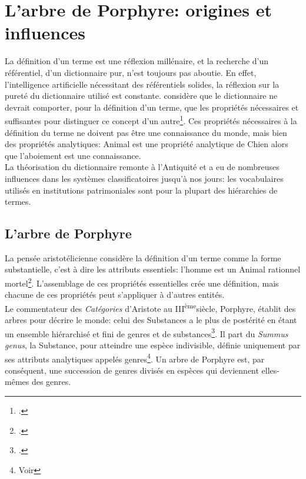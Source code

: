\section{\label{I-C-1}L'arbre de Porphyre: origines et influences}

La définition d'un terme est une réflexion millénaire, et la recherche d'un référentiel, d'un dictionnaire pur, n'est toujours pas aboutie. En effet, l'intelligence artificielle nécessitant des référentiels solides, la réflexion sur la pureté du dictionnaire utilisé est constante.  considère que le dictionnaire \og ne devrait comporter, pour la définition d'un  terme, que les propriétés nécessaires et suffisantes pour distinguer ce concept d'un autre\fg\footcite[chap.1]{eco_arbre_2010}. Ces propriétés nécessaires à la définition du terme ne doivent pas être une connaissance du monde, mais bien des propriétés analytiques: \og Animal\fg{} est une propriété analytique de \og Chien\fg{} alors que l'aboiement est une connaissance.\\

La théorisation du dictionnaire remonte à l'Antiquité et a eu de nombreuses influences dans les systèmes classificatoires jusqu'à nos jours: les vocabulaires utilisés en institutions patrimoniales sont pour la plupart des hiérarchies de termes.

\subsection{\label{I-C-1-a}L'arbre de Porphyre}

La pensée aristotélicienne considère la définition d'un terme comme la forme substantielle, c'est à dire les attributs essentiels: l'\og homme\fg{} est un \og Animal rationnel mortel\fg{}\footcite[chap.1]{eco_arbre_2010}. L'assemblage de ces propriétés essentielles crée une définition, mais chacune de ces propriétés peut s'appliquer à d'autres entités. \\

Le commentateur des \textit{Catégories} d'Aristote au \textsc{III}\textsuperscript{ème}siècle, Porphyre, établit des arbres pour décrire le monde: celui des \og Substances\fg{} a le plus de postérité en étant \og un ensemble hiérarchisé et fini de genres et de substances\fg{}\footcite[chap.1]{eco_arbre_2010}. Il part du \textit{Summus genus}, la Substance, pour atteindre une espèce indivisible, définie uniquement par ses attributs analytiques appelés genres\footnote{Voir }. Un arbre de Porphyre est, par conséquent, une succession de genres divisés en espèces qui deviennent elles-mêmes des genres.\\

